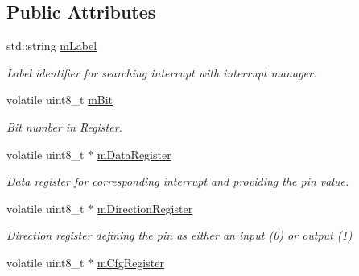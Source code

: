 \subsection*{Public Attributes}
\begin{DoxyCompactItemize}
\item 
std\+::string \hyperlink{classSPMB_1_1InterruptInput_ad07b7faae89412b9cbeb138efd0fb091}{m\+Label}\hypertarget{classSPMB_1_1InterruptInput_ad07b7faae89412b9cbeb138efd0fb091}{}\label{classSPMB_1_1InterruptInput_ad07b7faae89412b9cbeb138efd0fb091}

\begin{DoxyCompactList}\small\item\em Label identifier for searching interrupt with interrupt manager. \end{DoxyCompactList}\item 
volatile uint8\+\_\+t \hyperlink{classSPMB_1_1InterruptInput_a1c093ecf08a4b18066a61abb0cd9b783}{m\+Bit}\hypertarget{classSPMB_1_1InterruptInput_a1c093ecf08a4b18066a61abb0cd9b783}{}\label{classSPMB_1_1InterruptInput_a1c093ecf08a4b18066a61abb0cd9b783}

\begin{DoxyCompactList}\small\item\em Bit number in Register. \end{DoxyCompactList}\item 
volatile uint8\+\_\+t $\ast$ \hyperlink{classSPMB_1_1InterruptInput_a31b05aaa064545e134c6a158cfbcd5f3}{m\+Data\+Register}\hypertarget{classSPMB_1_1InterruptInput_a31b05aaa064545e134c6a158cfbcd5f3}{}\label{classSPMB_1_1InterruptInput_a31b05aaa064545e134c6a158cfbcd5f3}

\begin{DoxyCompactList}\small\item\em Data register for corresponding interrupt and providing the pin value. \end{DoxyCompactList}\item 
volatile uint8\+\_\+t $\ast$ \hyperlink{classSPMB_1_1InterruptInput_a0bc9e2864357842924edf1f7bb619754}{m\+Direction\+Register}\hypertarget{classSPMB_1_1InterruptInput_a0bc9e2864357842924edf1f7bb619754}{}\label{classSPMB_1_1InterruptInput_a0bc9e2864357842924edf1f7bb619754}

\begin{DoxyCompactList}\small\item\em Direction register defining the pin as either an input (0) or output (1) \end{DoxyCompactList}\item 
volatile uint8\+\_\+t $\ast$ \hyperlink{classSPMB_1_1InterruptInput_a9529d56cc9ec75b1977bad24ad28ec77}{m\+Cfg\+Register}\hypertarget{classSPMB_1_1InterruptInput_a9529d56cc9ec75b1977bad24ad28ec77}{}\label{classSPMB_1_1InterruptInput_a9529d56cc9ec75b1977bad24ad28ec77}


\end{DoxyCompactItemize}
